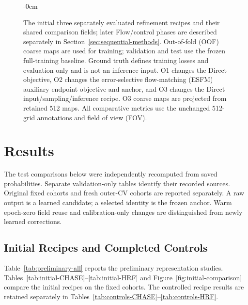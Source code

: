 \documentclass[jimaging,article,submit,pdftex,moreauthors]{Definitions/mdpi}
\begin{document}
\begin{figure}[H]
\begin{adjustwidth}{-\extralength}{0cm}
\end{adjustwidth}
\caption{The initial three separately evaluated refinement recipes and their shared comparison fields; later Flow/control phases are described separately in Section~\ref{sec:sequential-methods}. Out-of-fold (OOF) coarse maps are used for training; validation and test use the frozen full-training baseline. Ground truth defines training losses and evaluation only and is not an inference input. O1 changes the Direct objective, O2 changes the error-selective flow-matching (ESFM) auxiliary endpoint objective and anchor, and O3 changes the Direct input/sampling/inference recipe. O3 coarse maps are projected from retained 512 maps. All comparative metrics use the unchanged 512-grid annotations and field of view (FOV).}
\label{fig:workflow}
\end{figure}
\section{Results}\label{sec:results}
The test comparisons below were independently recomputed from saved probabilities. Separate validation-only tables identify their recorded sources. Original fixed cohorts and fresh outer-CV cohorts are reported separately. A raw output is a learned candidate; a selected identity is the frozen anchor. Warm epoch-zero field reuse and calibration-only changes are distinguished from newly learned corrections.
\subsection{Initial Recipes and Completed Controls}
Table~\ref{tab:preliminary-all} reports the preliminary representation studies. Tables~\ref{tab:initial-CHASE}--\ref{tab:initial-HRF} and Figure~\ref{fig:initial-comparison} compare the initial recipes on the fixed cohorts. The controlled recipe results are retained separately in Tables~\ref{tab:controls-CHASE}--\ref{tab:controls-HRF}.
\end{document}
